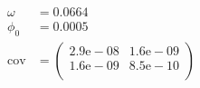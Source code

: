 \begin{align}
	\omega &= 0.0664 \\
	\phi_0 &= 0.0005 \\
	\mathrm{cov} &=
	\begin{pmatrix}
		2.9\mathrm{e}-08 &1.6\mathrm{e}-09 \\
		1.6\mathrm{e}-09 &8.5\mathrm{e}-10 \\
	\end{pmatrix} 
\end{align}

